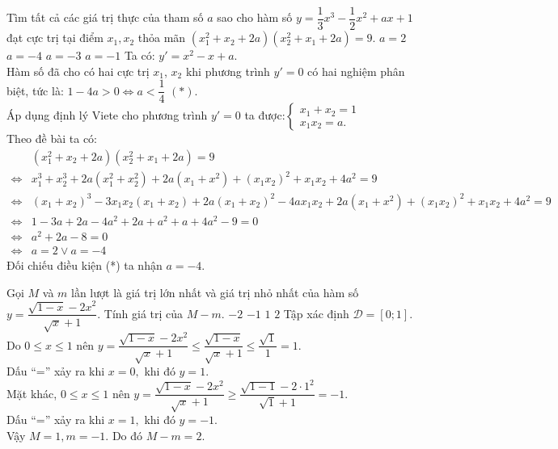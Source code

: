 \begin{ex}%
Tìm tất cả các giá trị thực của tham số $a$ sao cho hàm số $y=\dfrac{1}{3}x^3-\dfrac{1}{2}x^2+ax+1$ đạt cực trị tại điểm $x_1,x_2$ thỏa mãn $\left(x_1^2+x_2+2a\right)\left(x_2^2+x_1+2a\right)=9$.
 \choice
  {$a=2$}
  {\True $a=-4$}
  {$a=-3$}
  {$a=-1$}
 \loigiai
  {
  Ta có: $y'=x^2-x+a$.\\
  Hàm số đã cho có hai cực trị $x_1$, $x_2$ khi phương trình $y'=0$ có hai nghiệm phân biệt, tức là: $1-4a > 0 \Leftrightarrow a < \dfrac{1}{4} \,\, (*)$.\\
  Áp dụng định lý Viete cho phương trình $y'=0$ ta được:$\left\{\begin{array}{r}
  x_1+x_2 = 1\\ x_1x_2 = a.
  \end{array}\right.$\\
  Theo đề bài ta có:\\
  $\begin{array}{ll}
   				  & \left(x_1^2+x_2+2a\right)\left(x_2^2+x_1+2a\right)=9\\
  \Leftrightarrow & x_1^3 + x_2^3 +2a(x_1^2+x_2^2)+2a(x_1+x^2)+(x_1x_2)^2+x_1x_2+4a^2=9\\
  \Leftrightarrow & (x_1+x_2)^3-3x_1x_2(x_1+x_2)+2a(x_1+x_2)^2-4ax_1x_2+2a(x_1+x^2)+(x_1x_2)^2+x_1x_2+4a^2=9\\
  \Leftrightarrow & 1-3a+2a-4a^2+2a+a^2+a+4a^2-9=0\\
  \Leftrightarrow & a^2+2a-8=0\\
  \Leftrightarrow & a = 2 \vee a=-4
  \end{array}$\\
  Đối chiếu điều kiện (*) ta nhận $a = -4$.
  }
\end{ex}



\begin{ex}%
Gọi $M$ và $m$ lần lượt là giá trị lớn nhất và giá trị nhỏ nhất của hàm số $y=\dfrac{\sqrt{1-x}-2x^2}{\sqrt{x}+1}$. Tính giá trị của $M-m$.
 \choice
  {$-2$}
  {$-1$}
  {$1$}
  {\True $2$}
 \loigiai
  {
  Tập xác định $\mathscr{D}=[0;1]$.\\
  Do $0 \leq x \leq 1$ nên $y=\dfrac{\sqrt{1-x}-2x^2}{\sqrt{x}+1} \leq \dfrac{\sqrt{1-x}}{\sqrt{x}+1}\leq \dfrac{\sqrt{1}}{1}=1$.\\
  Dấu ``='' xảy ra khi $x=0,$ khi đó $y=1$.\\
  Mặt khác, $0 \leq x \leq 1$ nên $y=\dfrac{\sqrt{1-x}-2x^2}{\sqrt{x}+1} \geq \dfrac{\sqrt{1-1}-2\cdot 1^2}{\sqrt{1}+1}=-1$.\\
  Dấu ``='' xảy ra khi $x=1,$ khi đó $y=-1$.\\
  Vậy $M=1, m=-1$. Do đó $M-m=2$.
  }
\end{ex}



